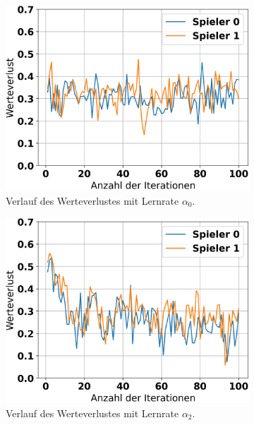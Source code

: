 \begin{figure}[ht!]%
	\begin{subfigure}[b]{0.32\textwidth}
		\includegraphics[width=\textwidth]{Bilder/ensemble-training/a_0_001/graph_value_losses.png}
		\caption{Verlauf des Werteverlustes mit Lernrate $\alpha_0$.}
		\label{fig:f13}
	\end{subfigure}
	\hfill
	\begin{subfigure}[b]{0.32\textwidth}
		\includegraphics[width=\textwidth]{Bilder/ensemble-training/c_0_0001/graph_value_losses.png}
		\caption{Verlauf des Werteverlustes mit Lernrate $\alpha_2$.}
		\label{fig:f14}
	\end{subfigure}
	\hfill
	\begin{subfigure}[b]{0.32\textwidth}

\end{subfigure}
\end{figure}
